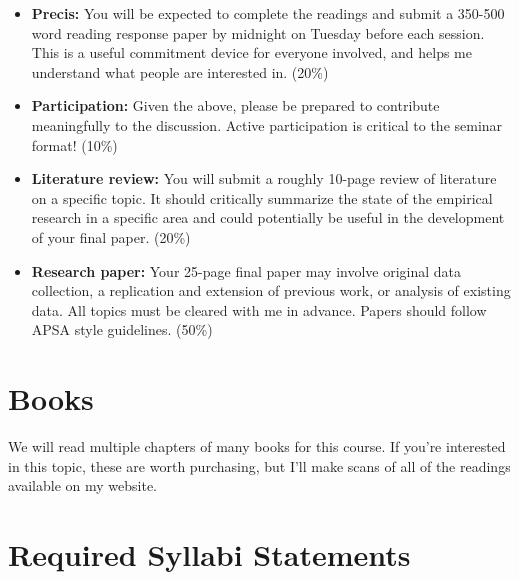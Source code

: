 \vspace{-.1in}\documentclass[11pt]{article}
\begin{document}
\begin{itemize}
	
\item {\bf Precis:} You will be expected to complete the readings and submit a 350-500 word reading response paper by midnight on Tuesday before each session. This is a useful commitment device for everyone involved, and helps me understand what people are interested in. (20\%)	
	
\item {\bf Participation:} Given the above, please be prepared to contribute meaningfully to the discussion. Active participation is critical to the seminar format! (10\%)

\item {\bf Literature review:} You will submit a roughly 10-page review of literature on a specific topic. It should critically summarize the state of the empirical research in a specific area and could potentially be useful in the development of your final paper. (20\%) %
\item {\bf Research paper:} Your 25-page final paper may involve original data collection, a replication and extension of previous work, or analysis of existing data. All topics must be cleared with me in advance. Papers should follow APSA style guidelines. (50\%) %
\end{itemize}

\section*{Books}




\noindent We will read multiple chapters of many books for this course. If you're interested in this topic, these are worth purchasing, but I'll make scans of all of the readings available on my website.



\section*{Required Syllabi Statements}
\end{document}
